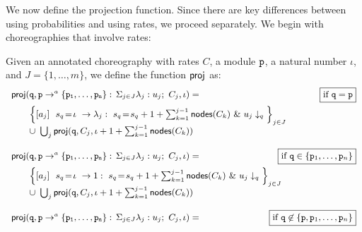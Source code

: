 We now define the projection function. Since there are key differences
between using probabilities and using rates, we proceed separately. We
begin with choreographies that involve rates:
% 
\begin{definition}\label{def:projCTMC} Given an
  annotated choreography with rates $C$, a module $\mathtt{p}$, a natural
  number $\iota$, and $J=\{1,\dots,m\}$, we define the function
  $\mathsf{proj}$ as:
  \begin{displaymath}\small
        \begin{array}{lr}

          \proj (\role q,\interactl{p}{a}{\role p_1,\ldots,\role p_n}, \iota)= 
          &  \boxed{\text{if }\role q=\role p}\\[2mm]
          \qquad
          \Big\{\commandBase {a_j} {\ s_{q}\!=\! \iota} {\lambda_j:\ s_{q}\!=\!
          s_{q} +1+\sum_{k=1}^{j-1}\mathsf{nodes}({C_k})}\ \&\ \projE
          {u_j}q\Big\}_{j\in J}
          \\
          \qquad\cup\ \bigcup_{j} \proj (\role q, C_j, \iota+1+\sum_{k=1}^{j-1}\mathsf{nodes}({C_k}))
          
          \\\\
          
          
          \proj (\role q,\interactl{p}{a}{\role p_1,\ldots,\role p_n}, \iota)= 
          &  \!\!\!\!\!\! \!\!\!\!\!\!\boxed{\text{if }\role q\in\{\role p_1,\ldots,\role p_n\}}\\[2mm]
          \qquad
          \Big\{\commandBase {a_j} {\ s_{q}\!=\! \iota} {1:\ s_{q}\!=\!
          s_{q} +1+\sum_{k=1}^{j-1}\mathsf{nodes}({C_k})}\ \&\ \projE
          {u_j}q\Big\}_{j\in J}
          \\
          \qquad\cup\ \bigcup_{j} \proj (\role q, C_j, \iota+1+\sum_{k=1}^{j-1}\mathsf{nodes}({C_k}))

          \\\\

          \proj (\role q,\interactl{p}a{\role p_1,\ldots,\role p_n}, \iota)=
          &  \hspace{-1.8cm}\boxed{\text{if }\role q\not\in\{\role p, 
            \role p_1,\ldots,\role p_n\}}
          \\[2mm]


\end{array}
\end{displaymath}
\end{definition}
